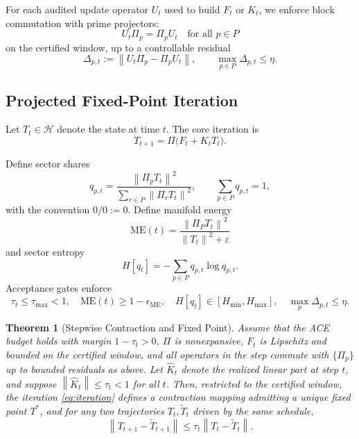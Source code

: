 \documentclass[11pt]{article}
\theoremstyle{definition}
\theoremstyle{plain}
\newtheorem{theorem}[definition]{Theorem}
\theoremstyle{remark}
\newcommand{\Hcal}{\mathcal{H}}
\newcommand{\norm}[1]{\left\lVert #1 \right\rVert}
\begin{document}
For each audited update operator $U_t$ used to build $F_t$ or $K_t$, we enforce block commutation with prime projectors:
\begin{equation}
  U_t \Pi_p = \Pi_p U_t \quad \text{for all } p \in P
\end{equation}
on the certified window, up to a controllable residual
\begin{equation}
  \Delta_{p,t} := \norm{U_t \Pi_p - \Pi_p U_t},\qquad
  \max_{p \in P} \Delta_{p,t} \le \eta.
\end{equation}

\subsection{Projected Fixed-Point Iteration}

Let $T_t \in \Hcal$ denote the state at time $t$.
The core iteration is
\begin{equation}\label{eq:iteration}
  T_{t+1} = \Pi\bigl(F_t + K_t T_t\bigr).
\end{equation}

Define sector shares
\begin{equation}
  q_{p,t} = \frac{\norm{\Pi_p T_t}^2}{\sum_{r \in P} \norm{\Pi_r T_t}^2},\qquad
  \sum_{p \in P} q_{p,t} = 1,
\end{equation}
with the convention $0/0 := 0$.
Define manifold energy
\begin{equation}
  \mathrm{ME}(t) = \frac{\norm{\Pi_P T_t}^2}{\norm{T_t}^2 + \varepsilon}
\end{equation}
and sector entropy
\begin{equation}
  H[q_t] = - \sum_{p \in P} q_{p,t} \log q_{p,t}.
\end{equation}
Acceptance gates enforce
\begin{equation}
  \tau_t \le \tau_{\max} < 1,\quad
  \mathrm{ME}(t) \ge 1 - \epsilon_{\mathrm{ME}},\quad
  H[q_t] \in [H_{\min}, H_{\max}],\quad
  \max_{p} \Delta_{p,t} \le \eta.
\end{equation}

\begin{theorem}[Stepwise Contraction and Fixed Point]
Assume that the ACE budget holds with margin $1-\tau_t>0$, $\Pi$ is nonexpansive, $F_t$ is Lipschitz and bounded on the certified window, and all operators in the step commute with $\{\Pi_p\}$ up to bounded residuals as above.
Let $\widehat{K}_t$ denote the realized linear part at step $t$, and suppose $\norm{\widehat{K}_t} \le \tau_t < 1$ for all $t$.
Then, restricted to the certified window, the iteration \eqref{eq:iteration} defines a contraction mapping admitting a unique fixed point $T^*$, and for any two trajectories $T_t,\widetilde{T}_t$ driven by the same schedule,
\[
  \norm{T_{t+1} - \widetilde{T}_{t+1}}
  \le \tau_t \norm{T_t - \widetilde{T}_t}.
\]
\end{theorem}
\end{document}
